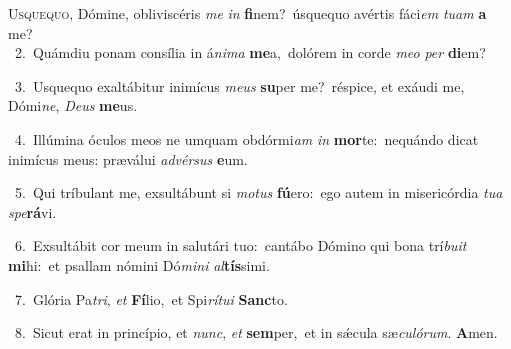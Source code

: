 \lettrine{\initial\textcolor{\initialcolor}{U}}{squequo,} Dómine, obliviscéris \textit{me} \textit{in} \textbf{fi}\-nem?~\star úsquequo avértis fáci\textit{em} \textit{tu}\-\textit{am} \textbf{a} me?\\
{\numbfont\textcolor{\numbcolor}{~2.}}~Quámdiu ponam consília in á\-\textit{ni}\-\textit{ma} \textbf{me}\-a,~\star dolórem in corde \textit{me}\-\textit{o} \textit{per} \textbf{di}\-em?\par
{\numbfont\textcolor{\numbcolor}{~3.}}~Usquequo exaltábitur inimícus \textit{me}\-\textit{us} \textbf{su}\-per me?~\star réspice, et exáudi me, Dómi\-\textit{ne}\-, \textit{De}\-\textit{us} \textbf{me}\-us.\par
{\numbfont\textcolor{\numbcolor}{~4.}}~Illúmina óculos meos ne umquam obdórmi\textit{am} \textit{in} \textbf{mor}\-te:~\star nequándo dicat inimícus meus: præválui \textit{ad}\-\textit{vér}\textit{sus} \textbf{e}\-um.\par
{\numbfont\textcolor{\numbcolor}{~5.}}~Qui tríbulant me, exsultábunt si \textit{mo}\-\textit{tus} \textbf{fú}\-ero:~\star ego autem in misericórdia \textit{tu}\-\textit{a} \textit{spe}\-\textbf{rá}vi.\par
{\numbfont\textcolor{\numbcolor}{~6.}}~Exsultábit cor meum in salutári tuo:~\dagger cantábo Dómino qui bona trí\-\textit{bu}\-\textit{it} \textbf{mi}\-hi:~\star et psallam nómini Dó\-\textit{mi}\-\textit{ni} \textit{al}\-\textbf{tís}simi.\par
{\numbfont\textcolor{\numbcolor}{~7.}}~Glória Pa\-\textit{tri}\-, \textit{et} \textbf{Fí}\-lio,~\star et Spi\-\textit{rí}\-\textit{tu}\textit{i} \textbf{Sanc}\-to.\par
{\numbfont\textcolor{\numbcolor}{~8.}}~Sicut erat in princípio, et \textit{nunc}\-, \textit{et} \textbf{sem}\-per,~\star et in sǽcula sæ\-\textit{cu}\-\textit{ló}\textit{rum}. \textbf{A}\-men.\par
